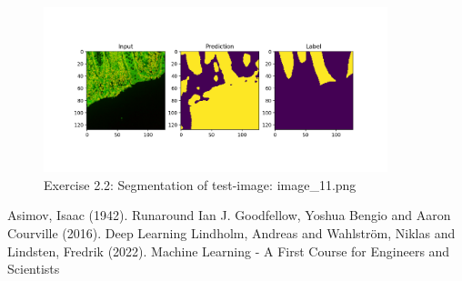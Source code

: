 \documentclass[a4paper,10pt]{article}
\begin{document}
\begin{figure}[ht!]
\centering
\includegraphics[width=100mm]{figures/assignment_3/segmentation_worse_best.png}
\caption{Exercise 2.2: Segmentation of test-image: image\_11.png}
\label{fig:worst}
\end{figure}




\begin{thebibliography}{1}

 Asimov, Isaac (1942). Runaround
 Ian J. Goodfellow, Yoshua Bengio and Aaron Courville (2016). Deep Learning
 Lindholm, Andreas and Wahlstr\"om, Niklas and Lindsten, Fredrik (2022). Machine Learning - A First Course for Engineers and Scientists


\end{thebibliography}
\end{document}
